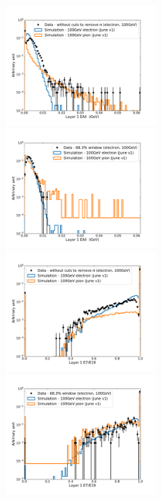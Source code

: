 \begin{figure}[p]
    \begin{center}  
    \includegraphics[width=0.5\textwidth]{Fig/fig_HGCAL/L1-EAll-GeV-NoWindow}~
    \includegraphics[width=0.5\textwidth]{Fig/fig_HGCAL/L1-EAll-GeV-WP68}\\
    \includegraphics[width=0.5\textwidth]{Fig/fig_HGCAL/L1-sum7-over-sum19-NoWindow}~
    \includegraphics[width=0.5\textwidth]{Fig/fig_HGCAL/L1-sum7-over-sum19-WP68}\\

\end{center}
\end{figure}
